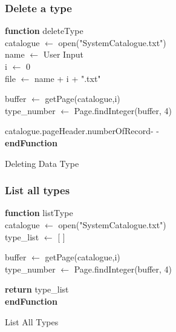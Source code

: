 \documentclass{article}
\begin{document}
        \subsubsection{Delete a type}
                 \begin{algorithm}[H]
\DontPrintSemicolon
\textbf{function} deleteType \\
catalogue $\leftarrow$ open("SystemCatalogue.txt") \\
name $\leftarrow$ User Input \\
i $\leftarrow$ 0 \\
file $\leftarrow$ name + i + ".txt" \\
  
 {
    buffer $\leftarrow$ getPage(catalogue,i) \\
    type\_number $\leftarrow$ Page.findInteger(buffer, 4) \\
    
 }
  
    catalogue.pageHeader.numberOfRecord- - \\
\textbf{endFunction} 
\caption{Deleting Data Type}
\end{algorithm}
        \subsubsection{List all types}
            \begin{algorithm}[H]
\DontPrintSemicolon
\textbf{function} listType \\
catalogue $\leftarrow$ open("SystemCatalogue.txt") \\
type\_list $\leftarrow$ [ ] \\

 {
    buffer $\leftarrow$ getPage(catalogue,i) \\
    type\_number $\leftarrow$ Page.findInteger(buffer, 4) \\
    
    
 }
  
   \textbf{return} type\_list \\
\textbf{endFunction} 
\caption{List All Types}
\end{algorithm}
\newpage
\end{document}
